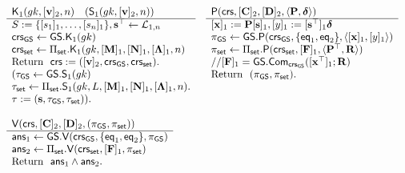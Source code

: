 \begin{figure} 
$$
\begin{array}{ll}
\begin{array}{l}
\algK_1(\gk,[\vecb{v}]_2,n)\quad (\mathsf{S}_1(\gk,[\vecb{v}]_2,n))\\
\hline
S:=\{[s_1]_1,\ldots,[s_n]_1\}, \vecb{s}^\top\gets\distlin_{1,n}\\
\crs_\GS\gets\GS.\algK_1(\gk)\\
{\crs_\sfset\gets\Pi_\sfset.\algK_1(\gk,[\matr{M}]_1,[\matr{N}]_1,[\matr{\Lambda}]_1,n)}\\
\text{Return } \ \crs:=([\vecb{v}]_2,\crs_\GS,\crs_\sfset).\\
(\tau_\GS\gets\GS.\algS_1(\gk)\\
\tau_\sfset\gets\Pi_\sfset.\algS_1(\gk,L,[\matr{M}]_1,[\matr{N}]_1,[\matr{\Lambda}]_1,n).\\
\tau := (\vecb{s},\tau_\GS,\tau_\sfset)).\\
\\
\end{array}
&
\begin{array}{l}
{\algP(\crs, [\matr{C}]_2, [\matr{D}]_2,\langle \matr{P}, \grkb{\delta}\rangle)}\\
\hline
[\vecb{x}]_1 := \matr{P}[\vecb{s}]_1,
[y]_1 := [\vecb{s}^\top]_1\grkb{\delta}\\
\pi_\GS\gets\GS.\algP(\crs_\GS,\{\eq_1,\eq_2\},\langle[\vecb{x}]_1,[y]_1\rangle)\\
\pi_\sfset \gets \Pi_\sfset.\algP(\crs_\sfset, [\matr{F}]_1,\langle\matr{P}^\top,\matr{R}\rangle)\\
//{[\matr{F}]_1} = \GS.\Com_{\crs_\GS}([\vecb{x}^\top]_1;\matr{R})\\
\text{Return } \  (\pi_\GS,\pi_\sfset). \\
\\
\\
\\
\end{array}\\
\begin{array}{l}
{\algV(\crs,[\matr{C}]_2,[\matr{D}]_2,(\pi_\GS,\pi_\sfset))}\\
\hline
\mathsf{ans}_1 \gets \GS.\algV(\crs_\GS,\{\eq_1,\eq_2\},\pi_\GS)\\
\mathsf{ans}_2 \gets \Pi_\sfset.\algV(\crs_\sfset,[\matr{F}]_1,\pi_\sfset)\\
\text{Return } \ \mathsf{ans}_1\wedge\mathsf{ans}_2.
\end{array}
&
\begin{array}{l}

\end{array}
\end{array}$$
\end{figure}
